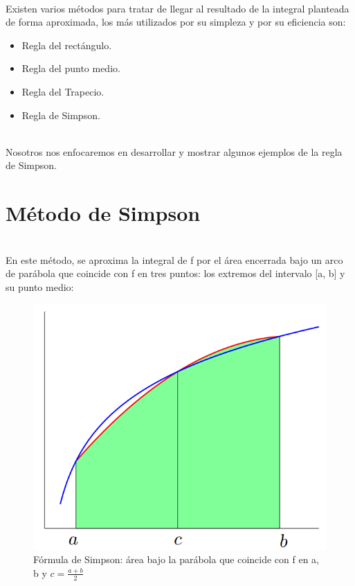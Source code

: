 \documentclass[report,oneside]{revcoles}
\begin{document}
~\\Existen varios métodos para tratar de llegar al resultado de la integral planteada de forma aproximada, los más utilizados por su simpleza y por su eficiencia son:
\begin{itemize}
\item Regla del rectángulo.
\item Regla del punto medio.
\item Regla del Trapecio.
\item Regla de Simpson.
\end{itemize}

~\\Nosotros nos enfocaremos en desarrollar y mostrar algunos ejemplos de la regla de Simpson.

\section{Método de Simpson}
~\\En este método, se aproxima la integral de f por el área encerrada bajo un arco de parábola que coincide con f en tres puntos: los extremos del intervalo [a, b] y su punto medio:
\begin{center}
\begin{figure}[h]
  \centering
  \includegraphics[scale=0.39]{FigurasUV/1.png}
  \caption{Fórmula de Simpson: área bajo la parábola que coincide con f en a, b y $c=\frac{a+b}{2}$}\label{figura1}
\end{figure}
\end{center}
\end{document}
